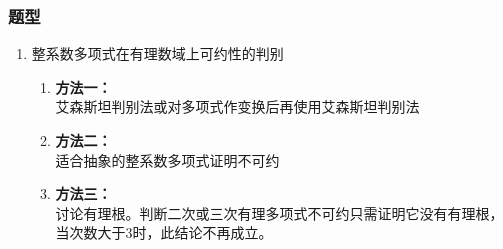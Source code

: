 \subsubsection{题型}
\begin{enumerate}
	\item 整系数多项式在有理数域上可约性的判别
	\begin{enumerate}
		\item \textbf{方法一：} \\
		艾森斯坦判别法或对多项式作变换后再使用艾森斯坦判别法
		\item \textbf{方法二：} \\
		适合抽象的整系数多项式证明不可约
		\item \textbf{方法三：} \\
		讨论有理根。判断二次或三次有理多项式不可约只需证明它没有有理根，当次数大于$3$时，此结论不再成立。
	\end{enumerate}
\end{enumerate}

